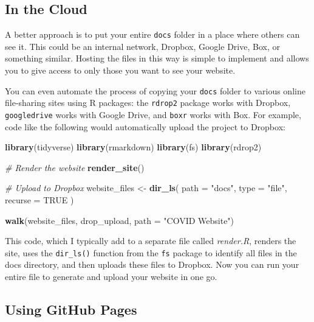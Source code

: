 \documentclass[
]{book}
\newenvironment{Shaded}{\begin{snugshade}}{\end{snugshade}}
\newcommand{\AttributeTok}[1]{\textcolor[rgb]{0.13,0.29,0.53}{#1}}
\newcommand{\CommentTok}[1]{\textcolor[rgb]{0.56,0.35,0.01}{\textit{#1}}}
\newcommand{\ConstantTok}[1]{\textcolor[rgb]{0.56,0.35,0.01}{#1}}
\newcommand{\FunctionTok}[1]{\textcolor[rgb]{0.13,0.29,0.53}{\textbf{#1}}}
\newcommand{\NormalTok}[1]{#1}
\newcommand{\OtherTok}[1]{\textcolor[rgb]{0.56,0.35,0.01}{#1}}
\newcommand{\StringTok}[1]{\textcolor[rgb]{0.31,0.60,0.02}{#1}}
\begin{document}
\hypertarget{in-the-cloud}{%
\subsection*{In the Cloud}\label{in-the-cloud}}

A better approach is to put your entire \texttt{docs} folder in a place where others can see it. This could be an internal network, Dropbox, Google Drive, Box, or something similar. Hosting the files in this way is simple to implement and allows you to give access to only those you want to see your website.

You can even automate the process of copying your \texttt{docs} folder to various online file-sharing sites using R packages: the \texttt{rdrop2} package works with Dropbox, \texttt{googledrive} works with Google Drive, and \texttt{boxr} works with Box. For example, code like the following would automatically upload the project to Dropbox:

\begin{Shaded}
\begin{Highlighting}[]
\FunctionTok{library}\NormalTok{(tidyverse)}
\FunctionTok{library}\NormalTok{(rmarkdown)}
\FunctionTok{library}\NormalTok{(fs)}
\FunctionTok{library}\NormalTok{(rdrop2)}

\CommentTok{\# Render the website}
\FunctionTok{render\_site}\NormalTok{()}

\CommentTok{\# Upload to Dropbox}
\NormalTok{website\_files }\OtherTok{\textless{}{-}} \FunctionTok{dir\_ls}\NormalTok{(}
  \AttributeTok{path =} \StringTok{"docs"}\NormalTok{,}
  \AttributeTok{type =} \StringTok{"file"}\NormalTok{,}
  \AttributeTok{recurse =} \ConstantTok{TRUE}
\NormalTok{)}

\FunctionTok{walk}\NormalTok{(website\_files, drop\_upload, }\AttributeTok{path =} \StringTok{"COVID Website"}\NormalTok{)}
\end{Highlighting}
\end{Shaded}

This code, which I typically add to a separate file called \emph{render.R}, renders the site, uses the \texttt{dir\_ls()} function from the \texttt{fs} package to identify all files in the docs directory, and then uploads these files to Dropbox. Now you can run your entire file to generate and upload your website in one go.

\hypertarget{using-github-pages}{%
\subsection*{Using GitHub Pages}\label{using-github-pages}}
\end{document}
